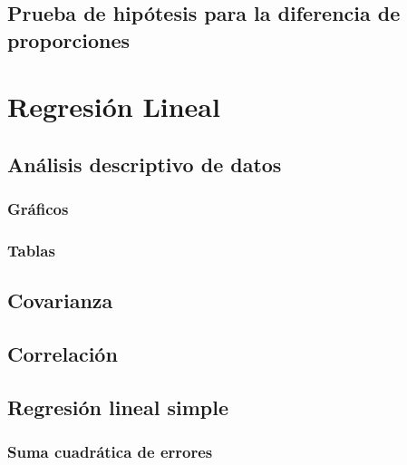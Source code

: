 \documentclass[
]{book}
\theoremstyle{definition}
\theoremstyle{definition}
\theoremstyle{definition}
\theoremstyle{definition}
\theoremstyle{remark}
\begin{document}
\hypertarget{prueba-de-hipuxf3tesis-para-la-diferencia-de-proporciones}{%
\section{Prueba de hipótesis para la diferencia de proporciones}\label{prueba-de-hipuxf3tesis-para-la-diferencia-de-proporciones}}

\hypertarget{regresiuxf3n-lineal}{%
\chapter{Regresión Lineal}\label{regresiuxf3n-lineal}}

\hypertarget{anuxe1lisis-descriptivo-de-datos}{%
\section{Análisis descriptivo de datos}\label{anuxe1lisis-descriptivo-de-datos}}

\hypertarget{gruxe1ficos}{%
\subsection{Gráficos}\label{gruxe1ficos}}

\hypertarget{tablas}{%
\subsection{Tablas}\label{tablas}}

\hypertarget{covarianza}{%
\section{Covarianza}\label{covarianza}}

\hypertarget{correlaciuxf3n}{%
\section{Correlación}\label{correlaciuxf3n}}

\hypertarget{regresiuxf3n-lineal-simple}{%
\section{Regresión lineal simple}\label{regresiuxf3n-lineal-simple}}

\hypertarget{suma-cuadruxe1tica-de-errores}{%
\subsection{Suma cuadrática de errores}\label{suma-cuadruxe1tica-de-errores}}
\end{document}
